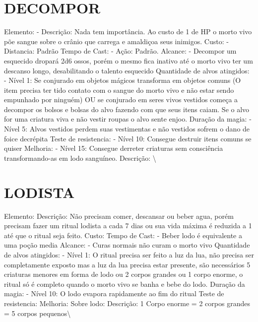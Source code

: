 \documentclass{article}%
\begin{document}
%
\section{DECOMPOR}%
\label{sec:DECOMPOR}%
Elemento: {-} Descrição: Nada tem importância. Ao custo de 1 de HP o morto vivo põe sangue sobre o crânio que carrega e amaldiçoa seus inimigos.\newline%
Custo: {-} Distancia: Padrão\newline%
Tempo de Cast: {-} Ação: Padrão.\newline%
Alcance: {-} Decompor um esquecido dropará 2d6 ossos, porém o mesmo fica inativo até o morto vivo ter um descanso longo, desabilitando o talento esquecido\newline%
Quantidade de alvos atingidos: {-} Nível 1: Se conjurado em objetos mágicos transforma em objetos comuns (O item precisa ter tido contato com o sangue do morto vivo e não estar sendo empunhado por ninguém) OU se conjurado em seres vivos vestidos começa a decompor os bolsos e bolsas do alvo fazendo com que seus itens caiam. Se o alvo for uma criatura viva e não vestir roupas o alvo sente enjoo.\newline%
Duração da magia: {-} Nível 5: Alvos vestidos perdem suas vestimentas e não vestidos sofrem o dano de foice decrépita\newline%
Teste de resistencia: {-} Nível 10: Consegue destruir itens comuns se quiser\newline%
Melhoria: {-} Nível 15: Consegue derreter criaturas sem consciência transformando{-}as em lodo sanguíneo.\newline%
Descrição: \textbackslash{}

%
\section{LODISTA}%
\label{sec:LODISTA}%
Elemento: Descrição: Não precisam comer, descansar ou beber agua, porém precisam fazer um ritual lodista a cada 7 dias ou sua vida máxima é reduzida a 1 até que o ritual seja feito.\newline%
Custo: \newline%
Tempo de Cast: {-} Beber lodo é equivalente a uma poção media\newline%
Alcance: {-} Curas normais não curam o morto vivo\newline%
Quantidade de alvos atingidos: {-} Nível 1:  O ritual precisa ser feito a luz da lua, não precisa ser completamente exposto mas a luz da lua precisa estar presente, são necessários 5 criaturas menores em forma de lodo ou 2 corpos grandes ou 1 corpo enorme, o ritual só é completo quando o morto vivo se banha e bebe do lodo.\newline%
Duração da magia: {-} Nível 10: O lodo evapora rapidamente ao fim do ritual\newline%
Teste de resistencia: \newline%
Melhoria: Sobre lodo:\newline%
Descrição: 1 Corpo enorme = 2 corpos grandes = 5 corpos pequenos\textbackslash{}
\end{document}
